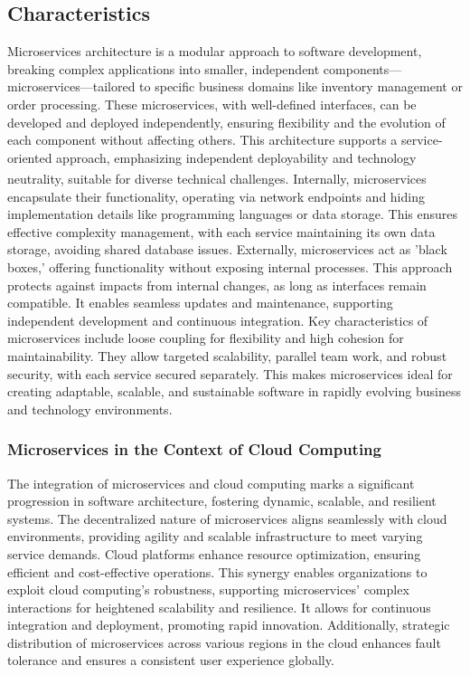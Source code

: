 \subsection{Characteristics}
Microservices architecture is a modular approach to software development, breaking complex
applications into smaller, independent components—microservices—tailored to specific business
domains like inventory management or order processing. These microservices, with well-defined
interfaces, can be developed and deployed independently, ensuring flexibility and the evolution of
each component without affecting others. This architecture supports a service-oriented approach,
emphasizing independent deployability and technology neutrality, suitable for diverse technical
challenges\textsuperscript{\cite{microservices_book}}.
\newline\newline
Internally, microservices encapsulate their functionality, operating via network endpoints and
hiding implementation details like programming languages or data storage. This ensures effective
complexity management, with each service maintaining its own data storage, avoiding shared database
issues.
\newline\newline
Externally, microservices act as 'black boxes,' offering functionality without exposing internal
processes. This approach protects against impacts from internal changes, as long as interfaces
remain compatible. It enables seamless updates and maintenance, supporting independent development
and continuous integration.
\newline\newline
Key characteristics of microservices include loose coupling for flexibility and high cohesion for
maintainability. They allow targeted scalability, parallel team work, and robust security, with each
service secured separately. This makes microservices ideal for creating adaptable, scalable, and
sustainable software in rapidly evolving business and technology environments.

\subsubsection{Microservices in the Context of Cloud Computing}
The integration of microservices and cloud computing marks a significant progression in software
architecture, fostering dynamic, scalable, and resilient systems. The decentralized nature of
microservices aligns seamlessly with cloud environments, providing agility and scalable
infrastructure to meet varying service demands. Cloud platforms enhance resource optimization,
ensuring efficient and cost-effective operations. This synergy enables organizations to exploit
cloud computing's robustness, supporting microservices' complex interactions for heightened
scalability and resilience. It allows for continuous integration and deployment, promoting rapid
innovation. Additionally, strategic distribution of microservices across various regions in the
cloud enhances fault tolerance and ensures a consistent user experience globally.

